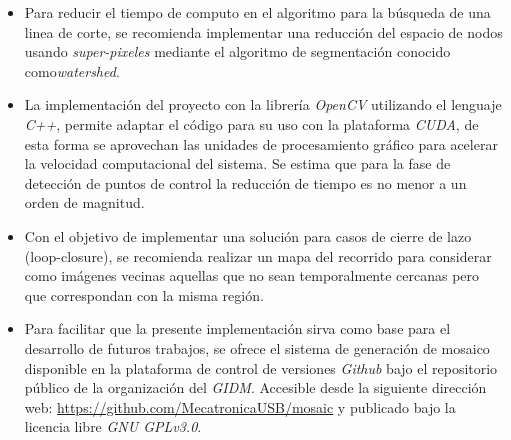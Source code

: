 \begin{itemize}
	\item Para reducir el tiempo de computo en el algoritmo para la búsqueda de una linea de corte, se recomienda implementar una reducción del espacio de nodos usando \textit{super-pixeles} mediante el algoritmo de segmentación conocido como\textit{watershed}.
	
	\item La implementación del proyecto con la librería \textit{OpenCV} utilizando el lenguaje \textit{C++}, permite adaptar el código para su uso con la plataforma \textit{CUDA}, de esta forma se aprovechan las unidades de procesamiento gráfico para acelerar la velocidad computacional del sistema. Se estima que para la fase de detección de puntos de control la reducción de tiempo es no menor a un orden de magnitud.
	
	\item Con el objetivo de implementar una solución para casos de cierre de lazo (loop-closure), se recomienda realizar un mapa del recorrido para considerar como imágenes vecinas aquellas que no sean temporalmente cercanas pero que correspondan con la misma región.
	
	\item Para facilitar que la presente implementación sirva como base para el desarrollo de futuros trabajos, se ofrece el sistema de generación de mosaico disponible en la plataforma de control de versiones \textit{Github} bajo el repositorio público de la organización del \textit{GIDM}. Accesible desde la siguiente dirección web: \url{https://github.com/MecatronicaUSB/mosaic} y publicado bajo la licencia libre \textit{GNU GPLv3.0}.
\end{itemize}

